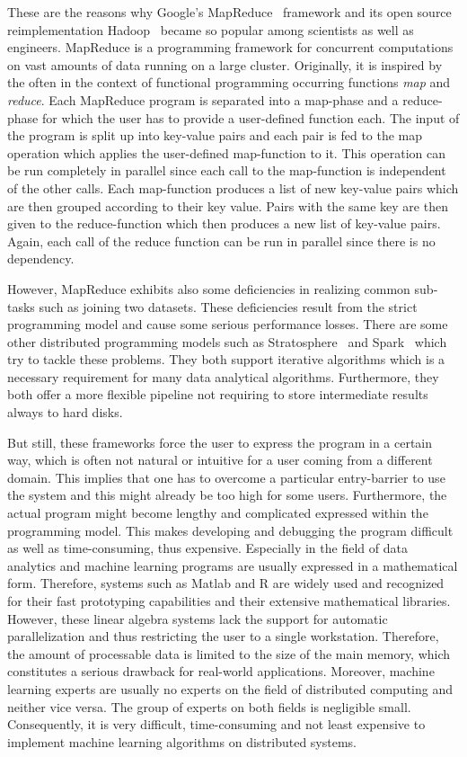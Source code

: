 \documentclass{dima}
\begin{document}
These are the reasons why Google's MapReduce~\cite{dean:c2008a} framework and its open source reimplementation Hadoop~\cite{hadoop:2008a} became so popular among scientists as well as engineers.
MapReduce is a programming framework for concurrent computations on vast amounts of data running on a large cluster. 
Originally, it is inspired by the often in the context of functional programming occurring functions \emph{map} and \emph{reduce}.
Each MapReduce program is separated into a map-phase and a reduce-phase for which the user has to provide a user-defined function each.
The input of the program is split up into key-value pairs and each pair is fed to the map operation which applies the user-defined map-function to it.
This operation can be run completely in parallel since each call to the map-function is independent of the other calls.
Each map-function produces a list of new key-value pairs which are then grouped according to their key value.
Pairs with the same key are then given to the reduce-function which then produces a new list of key-value pairs.
Again, each call of the reduce function can be run in parallel since there is no dependency.

However, MapReduce exhibits also some deficiencies in realizing common sub-tasks such as joining two datasets.
These deficiencies result from the strict programming model and cause some serious performance losses.
There are some other distributed programming models such as Stratosphere~\cite{battre:2010a} and Spark~\cite{zaharia:2010a} which try to tackle these problems.
They both support iterative algorithms which is a necessary requirement for many data analytical algorithms.
Furthermore, they both offer a more flexible pipeline not requiring to store intermediate results always to hard disks.

But still, these frameworks force the user to express the program in a certain way, which is often not natural or intuitive for a user coming from a different domain.
This implies that one has to overcome a particular entry-barrier to use the system and this might already be too high for some users.
Furthermore, the actual program might become lengthy and complicated expressed within the programming model.
This makes developing and debugging the program difficult as well as time-consuming, thus expensive.
Especially in the field of data analytics and machine learning programs are usually expressed in a mathematical form.
Therefore, systems such as Matlab and R are widely used and recognized for their fast prototyping capabilities and their extensive mathematical libraries.
However, these linear algebra systems lack the support for automatic parallelization and thus restricting the user to a single workstation.
Therefore, the amount of processable data is limited to the size of the main memory, which constitutes a serious drawback for real-world applications.
Moreover, machine learning experts are usually no experts on the field of distributed computing and neither vice versa.
The group of experts on both fields is negligible small.
Consequently, it is very difficult, time-consuming and not least expensive to implement machine learning algorithms on distributed systems.
\end{document}
